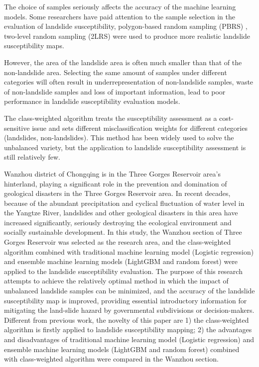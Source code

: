\documentclass[a4paper,fleqn]{cas-sc}
\begin{document}
The choice of samples seriously affects the accuracy of the machine learning models. 
Some researchers have paid attention to the sample selection in the evaluation of landslide susceptibility, polygon-based random sampling (PBRS) \citep{San2014IJoAEOaG}, two-level random sampling (2LRS) \citep{Ada2017NH, Aktas2019C&G} were used to produce more realistic landslide susceptibility maps.

However, the area of the landslide area is often much smaller than that of the non-landslide area. 
Selecting the same amount of samples under different categories will often result in underrepresentation of non-landslide samples, waste of non-landslide samples and loss of important information, lead to poor performance in landslide susceptibility evaluation models.

The class-weighted algorithm treats the susceptibility assessment as a cost-sensitive issue and sets different misclassification weights for different categories (landslides, non-landslides). 
This method has been widely used to solve the unbalanced variety, but the application to landslide susceptibility assessment is still relatively few.



Wanzhou district of Chongqing is in the Three Gorges Reservoir area's hinterland, playing a significant role in the prevention and domination of geological disasters in the Three Gorges Reservoir area. 
In recent decades, because of the abundant precipitation and cyclical fluctuation of water level in the Yangtze River, landslides and other geological disasters in this area have increased significantly, seriously destroying the ecological environment and socially sustainable development. 
In this study, the Wanzhou section of Three Gorges Reservoir was selected as the research area, and the class-weighted algorithm combined with traditional machine learning model (Logistic regression) and ensemble machine learning models (LightGBM and random forest) were applied to the landslide susceptibility evaluation. 
The purpose of this research attempts to achieve the relatively optimal method in which the impact of unbalanced landslide samples can be minimized, and the accuracy of the landslide susceptibility map is improved, providing essential introductory information for mitigating the land-slide hazard by governmental subdivisions or decision-makers. 
Different from previous work, the novelty of this paper are 1) the class-weighted algorithm is firstly applied to landslide susceptibility mapping; 2) the advantages and disadvantages of traditional machine learning model (Logistic regression) and ensemble machine learning models (LightGBM and random forest) combined with class-weighted algorithm were compared in the Wanzhou section.
\end{document}
